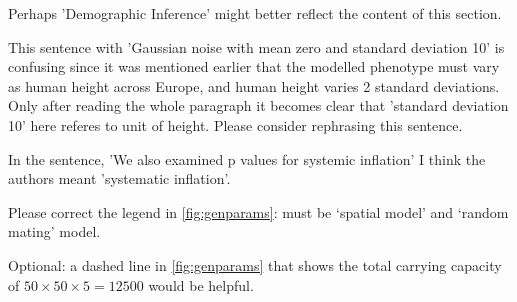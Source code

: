 
\begin{point}{\revref}
    Perhaps 'Demographic Inference' might better reflect the content of this section.
\end{point}


\begin{point}{\revref}
    This sentence with 'Gaussian noise with mean zero and standard deviation 10' is confusing since it was mentioned earlier that the modelled phenotype must vary as human height across Europe, and human height varies 2 standard deviations. Only after reading the whole paragraph it becomes clear that 'standard deviation 10' here referes to unit of height. Please consider rephrasing this sentence.
\end{point}


\begin{point}{\revref}
    In the sentence, 'We also examined p values for systemic inflation' I think the authors meant 'systematic inflation'.
\end{point}


\begin{point}{}
    Please correct the legend in \autoref{fig:genparams}:
    must be `spatial model' and `random mating' model.
\end{point}


\begin{point}{}
    Optional: a dashed line in \autoref{fig:genparams}
    that shows the total carrying capacity of $50 \times 50 \times 5=12500$ would be helpful.
\end{point}


